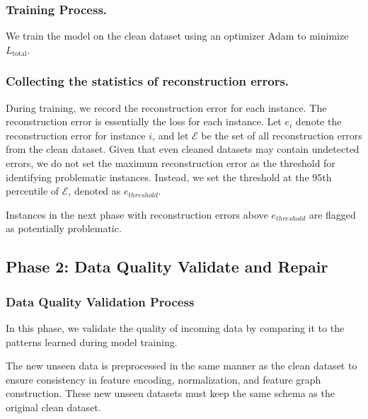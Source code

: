 {\subsubsection{\textbf{Training Process.}}
We train the model on the clean dataset using an optimizer Adam to minimize $L_{\text{total}}$. %

\subsubsection{\textbf{Collecting the statistics of reconstruction errors.}}
During training, we record the reconstruction error for each instance.
The reconstruction error is essentially the loss for each instance.
Let $e_i$ denote the reconstruction error for instance $i$, and let $\mathcal{E}$ be the set of all reconstruction errors from the clean dataset. 
Given that even cleaned datasets may contain undetected errors, we do not set the maximum reconstruction error as the threshold for identifying problematic instances. 
Instead, we set the threshold at the 95th percentile of \(\mathcal{E}\), denoted as \( e_{threshold} \).

Instances in the next phase with reconstruction errors above \( e_{threshold} \) are flagged as potentially problematic.


\subsection{Phase 2: Data Quality Validate and Repair}

\subsubsection{\textbf{Data Quality Validation Process}}
In this phase, we validate the quality of incoming data by comparing it to the patterns learned during model training.

The new unseen data is preprocessed in the same manner as the clean dataset to ensure consistency in feature encoding, normalization, and feature graph construction. These new unseen datasets must keep the same schema as the original clean dataset.

}
